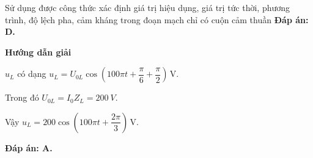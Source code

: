 \begin{dang}{ Sử dụng được công thức xác định giá trị hiệu dụng, giá trị tức thời, phương trình, độ lệch pha, cảm kháng trong đoạn mạch chỉ có cuộn cảm thuần}
{		
		\textbf{Đáp án: D.}
	}
	{\begin{center}
			\textbf{Hướng dẫn giải}
		\end{center}
		
		
		$u_L$ có dạng $u_L=U_{0L}\cos\left(100\pi t+\dfrac{\pi}{6}+\dfrac{\pi}{2}\right)\,\text{V}$.
		
		Trong đó
		$U_{0L}=I_0Z_L=\SI{200}{V}$.
		
		Vậy $u_L=200\cos\left(100\pi t+\dfrac{2\pi}{3}\right)\,\text{V}$.
		
		\textbf{	Đáp án: A.}
		
		
	}
\end{dang}



